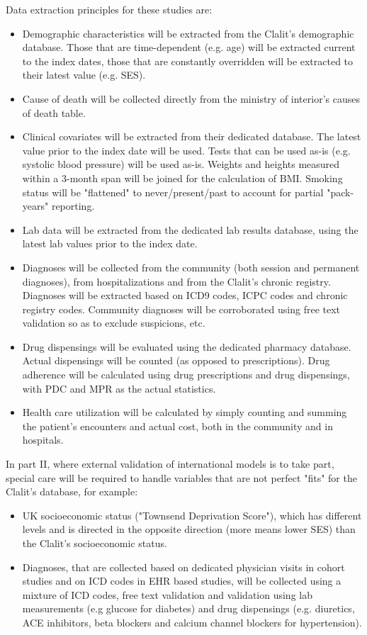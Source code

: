 \documentclass[a4paper,12pt]{article}
\begin{document}
	Data extraction principles for these studies are:
	\begin{itemize}
		\item Demographic characteristics will be extracted from the Clalit's demographic database. Those that are time-dependent (e.g. age) will be extracted current to the index dates, those that are constantly overridden will be extracted to their latest value (e.g. SES).
		\item Cause of death will be collected directly from the ministry of interior's causes of death table.
		\item Clinical covariates will be extracted from their dedicated database. The latest value prior to the index date will be used. Tests that can be used as-is (e.g. systolic blood pressure) will be used as-is. Weights and heights measured within a 3-month span will be joined for the calculation of BMI. Smoking status will be "flattened" to never/present/past to account for partial "pack-years" reporting.
		\item Lab data will be extracted from the dedicated lab results database, using the latest lab values prior to the index date.
		\item Diagnoses will be collected from the community (both session and permanent diagnoses), from hospitalizations and from the Clalit's chronic registry\cite{Rennert2001}. Diagnoses will be extracted based on ICD9 codes, ICPC codes and chronic registry codes. Community diagnoses will be corroborated using free text validation so as to exclude suspicions, etc.
		\item Drug dispensings will be evaluated using the dedicated pharmacy database. Actual dispensings will be counted (as opposed to prescriptions). Drug adherence will be calculated using drug prescriptions and drug dispensings, with PDC and MPR as the actual statistics\cite{Lam2015}.
		\item Health care utilization will be calculated by simply counting and summing the patient's encounters and actual cost, both in the community and in hospitals.
	\end{itemize}
	
	In part II, where external validation of international models is to take part, special care will be required to handle variables that are not perfect "fits" for the Clalit's database, for example:
	\begin{itemize}
		\item UK socioeconomic status ("Townsend Deprivation Score"), which has different levels and is directed in the opposite direction (more means lower SES) than the Clalit's socioeconomic status.
		\item Diagnoses, that are collected based on dedicated physician visits in cohort studies and on ICD codes in EHR based studies, will be collected using a mixture of ICD codes, free text validation and validation using lab measurements (e.g glucose for diabetes) and drug dispensings (e.g. diuretics, ACE inhibitors, beta blockers and calcium channel blockers for hypertension).
	\end{itemize}
\end{document}
